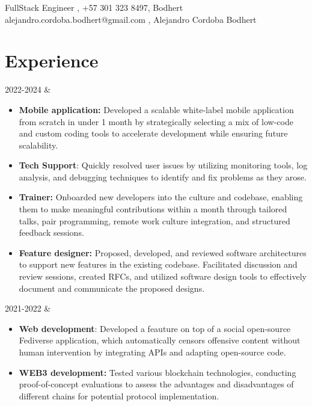 \documentclass[
    changecolor={111, 156, 45}, 
]{cv-roald}
\begin{document}
\pagestyle{empty} %

 {%
  \FAspace FullStack Engineer \sep
  \faMobile \FAspace +57 301 323 8497\sep%
  \faGithub \FAspace Bodhert \FAspace {}
 }
 {%
  \faEnvelope \FAspace alejandro.cordoba.bodhert@gmail.com \sep%
  \faLinkedinSquare  \FAspace Alejandro Cordoba Bodhert \FAspace {}
 }


\section*{Experience}
\begin{tabularcv}
2022-2024 & 
\begin{itemize}
\item \textbf{Mobile application:} Developed a scalable white-label mobile application from scratch in under 1 month by strategically selecting a mix of low-code and custom coding tools to accelerate development while ensuring future scalability.
\item \textbf{Tech Support}: Quickly resolved user issues by utilizing monitoring tools, log analysis, and debugging techniques to identify and fix problems as they arose.
\item \textbf{Trainer:} Onboarded new developers into the culture and codebase, enabling them to make meaningful contributions within a month through tailored talks, pair programming, remote work culture integration, and structured feedback sessions.
\item \textbf{Feature designer:} Proposed, developed, and reviewed software architectures to support new features in the existing codebase. Facilitated discussion and review sessions, created RFCs, and utilized software design tools to effectively document and communicate the proposed designs.
\end{itemize}
\end{tabularcv}
\begin{tabularcv}
2021-2022 & 
\begin{itemize}
    \item \textbf{Web development}: Developed a feauture on top of a social open-source Fediverse application, which automatically censors offensive content without human intervention by integrating APIs and adapting open-source code.
    \item \textbf{WEB3 development:} Tested various blockchain technologies, conducting proof-of-concept evaluations to assess the advantages and disadvantages of different chains for potential protocol implementation.
\end{itemize}
\end{tabularcv}
\end{document}
